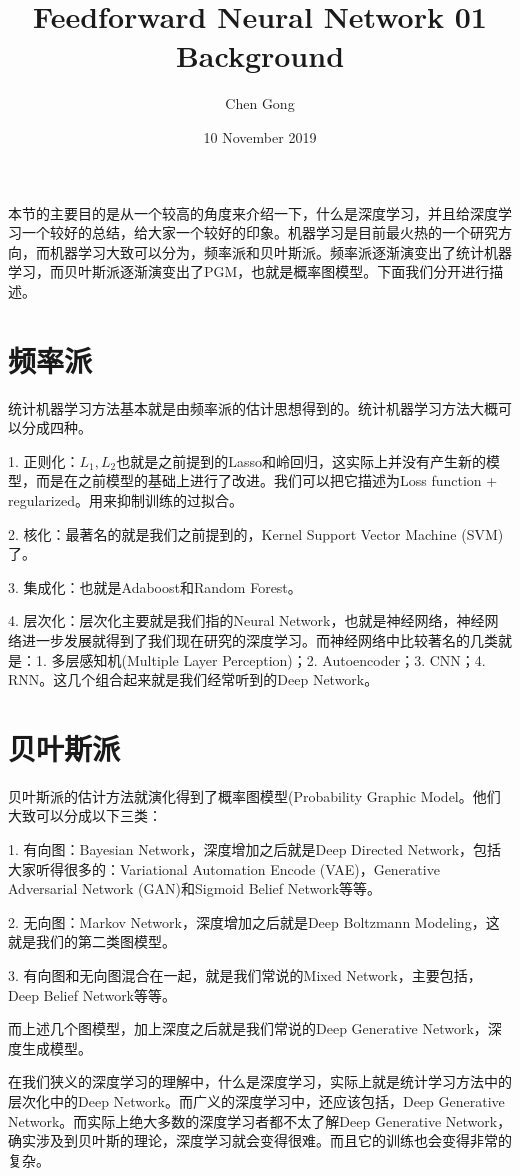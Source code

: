 \documentclass[a4paper]{article}
\title{Feedforward Neural Network 01 Background}
\author{Chen Gong}
\date{10 November 2019}
\begin{document}
\maketitle

本节的主要目的是从一个较高的角度来介绍一下，什么是深度学习，并且给深度学习一个较好的总结，给大家一个较好的印象。机器学习是目前最火热的一个研究方向，而机器学习大致可以分为，频率派和贝叶斯派。频率派逐渐演变出了统计机器学习，而贝叶斯派逐渐演变出了PGM，也就是概率图模型。下面我们分开进行描述。

\section{频率派}
统计机器学习方法基本就是由频率派的估计思想得到的。统计机器学习方法大概可以分成四种。

1. 正则化：$L_1,L_2$也就是之前提到的Lasso和岭回归，这实际上并没有产生新的模型，而是在之前模型的基础上进行了改进。我们可以把它描述为Loss function + regularized。用来抑制训练的过拟合。

2. 核化：最著名的就是我们之前提到的，Kernel Support Vector Machine (SVM)了。

3. 集成化：也就是Adaboost和Random Forest。

4. 层次化：层次化主要就是我们指的Neural Network，也就是神经网络，神经网络进一步发展就得到了我们现在研究的深度学习。而神经网络中比较著名的几类就是：1. 多层感知机(Multiple Layer Perception)；2. Autoencoder；3. CNN；4. RNN。这几个组合起来就是我们经常听到的Deep Network。

\section{贝叶斯派}
贝叶斯派的估计方法就演化得到了概率图模型(Probability Graphic Model。他们大致可以分成以下三类：

1. 有向图：Bayesian Network，深度增加之后就是Deep Directed Network，包括大家听得很多的：Variational Automation Encode (VAE)，Generative Adversarial Network (GAN)和Sigmoid Belief Network等等。

2. 无向图：Markov Network，深度增加之后就是Deep Boltzmann Modeling，这就是我们的第二类图模型。

3. 有向图和无向图混合在一起，就是我们常说的Mixed Network，主要包括，Deep Belief Network等等。

而上述几个图模型，加上深度之后就是我们常说的Deep Generative Network，深度生成模型。

在我们狭义的深度学习的理解中，什么是深度学习，实际上就是统计学习方法中的层次化中的Deep Network。而广义的深度学习中，还应该包括，Deep Generative Network。而实际上绝大多数的深度学习者都不太了解Deep Generative Network，确实涉及到贝叶斯的理论，深度学习就会变得很难。而且它的训练也会变得非常的复杂。
\end{document}
